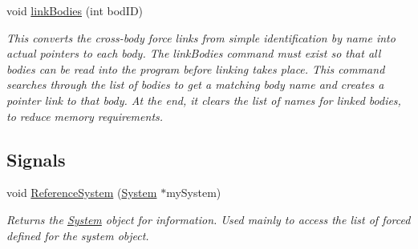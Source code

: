 \begin{DoxyCompactItemize}
void \hyperlink{class_system_a280d384672341228d20181ea390118b9}{link\-Bodies} (int bod\-I\-D)
\begin{DoxyCompactList}\small\item\em This converts the cross-\/body force links from simple identification by name into actual pointers to each body. The link\-Bodies command must exist so that all bodies can be read into the program before linking takes place. This command searches through the list of bodies to get a matching body name and creates a pointer link to that body. At the end, it clears the list of names for linked bodies, to reduce memory requirements. \end{DoxyCompactList}\end{DoxyCompactItemize}
\subsection*{Signals}
\begin{DoxyCompactItemize}
\item 
void \hyperlink{class_system_a5f20031d9a9b7ee89e035da6dcec6243}{Reference\-System} (\hyperlink{class_system}{System} $\ast$my\-System)
\begin{DoxyCompactList}\small\item\em Returns the \hyperlink{class_system}{System} object for information. Used mainly to access the list of forced defined for the system object. \end{DoxyCompactList}\end{DoxyCompactItemize}
